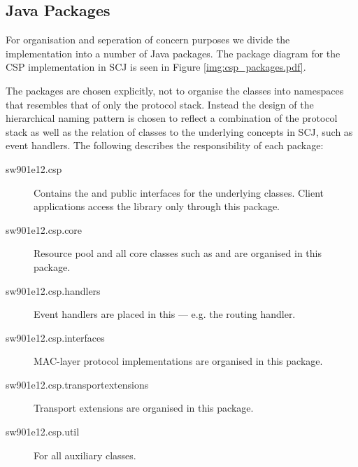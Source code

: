 \subsection{Java Packages}
For organisation and seperation of concern purposes we divide the implementation into a number of Java packages. The package diagram for the CSP implementation in SCJ is seen in Figure \ref{img:csp_packages.pdf}.

The packages are chosen explicitly, not to organise the classes into namespaces that resembles that of only the protocol stack. Instead the design of the hierarchical naming pattern is chosen to reflect a combination of the protocol stack as well as the relation of classes to the underlying concepts in SCJ, such as event handlers. The following describes the responsibility of each package:
\begin{description}
	\item[sw901e12.csp] Contains the  and public interfaces for the underlying classes. Client applications access the library only through this package.
	\item[sw901e12.csp.core] Resource pool and all core classes such as  and  are organised in this package.
	\item[sw901e12.csp.handlers] Event handlers are placed in this --- e.g. the routing handler.
	\item[sw901e12.csp.interfaces] MAC-layer protocol implementations are organised in this package.
	\item[sw901e12.csp.transportextensions] Transport extensions are organised in this package.
	\item[sw901e12.csp.util] For all auxiliary classes.
\end{description}